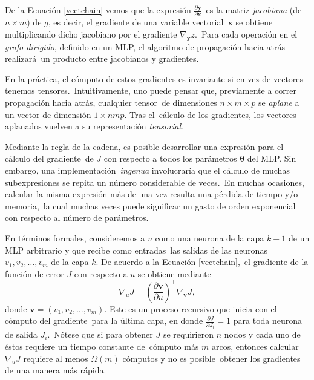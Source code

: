 De la Ecuación \ref{vectchain} vemos que la expresión $\frac{\partial \mathbf{y}}{\partial \mathbf{x}}$\
es la matriz \emph{jacobiana} (de $n \times m$) de $g$, es decir, el gradiente de una variable vectorial\
$\mathbf{x}$ se obtiene multiplicando dicho jacobiano por el gradiente $\nabla_{\mathbf{y}} z$.\
Para cada operación en el \emph{grafo dirigido}, definido en un MLP, el algoritmo de propagación hacia atrás realizará\
un producto entre jacobianos y gradientes.\par
En la práctica, el cómputo de estos gradientes es invariante si en vez de vectores tenemos tensores.\
Intuitivamente, uno puede pensar que, previamente a correr propagación hacia atrás, cualquier tensor\
de dimensiones $n \times m \times p$ se \emph{aplane} a un vector de dimensión $1 \times nmp$. Tras el\
cálculo de los gradientes, los vectores aplanados vuelven a su representación \emph{tensorial}.\par
Mediante la regla de la cadena, es posible desarrollar una expresión para el cálculo del gradiente\
de $J$ con respecto a todos los parámetros $\bm{\theta}$ del MLP. Sin embargo, una implementación\
\emph{ingenua} involucraría que el cálculo de muchas subexpresiones se repita un número considerable de veces.\
En muchas ocasiones, calcular la misma expresión más de una vez resulta una pérdida de tiempo y/o memoria,\
la cual muchas veces puede significar un gasto de orden exponencial con respecto al número de parámetros.\par
En términos formales, consideremos a $u$ como una neurona de la capa $k+1$ de un MLP arbitrario y que recibe como entradas\
las salidas de las neuronas $v_1, v_2, \ldots, v_m$ de la capa $k$. De acuerdo a la Ecuación \ref{vectchain},\
el gradiente de la función de error $J$ con respecto a $u$ se obtiene mediante
\begin{equation}
  \nabla_{u} J =
  \left(\frac{\partial \bm{v}}{\partial u}\right)^\top \nabla_{\bm{v}} J, \label{neurongradient} 
\end{equation}
donde $\bm{v} = (v_1, v_2, \ldots, v_m)$. Este es un proceso recursivo que inicia con el cómputo del gradiente\
para la última capa, en donde $\frac{\partial J}{\partial J_i} = 1$ para toda neurona de salida $J_i$.\
Nótese que si para obtener $J$ se requirieron $n$ nodos y cada uno de éstos requiere un tiempo constante de\
cómputo más $m$ arcos, entonces calcular $\nabla_{u} J$ requiere al menos $\Omega(m)$ cómputos y no es posible\
obtener los gradientes de una manera más rápida.\par
